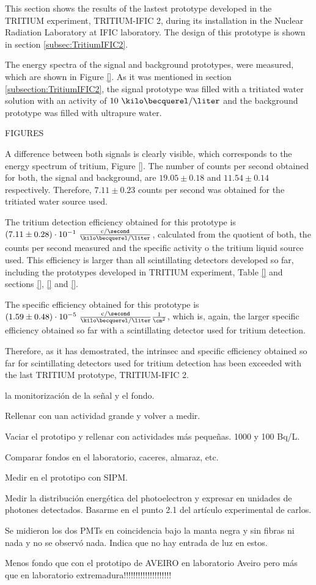 This section shows the results of the lastest prototype developed in the TRITIUM experiment, TRITIUM-IFIC 2, during its installation in the Nuclear Radiation Laboratory at IFIC laboratory. The design of this prototype is shown in section \ref{subsec:TritiumIFIC2}.

The energy spectra of the signal and background prototypes, were measured, which are shown in Figure \ref{}. As it was mentioned in section \ref{subsection:TritiumIFIC2}, the signal prototype was filled with a tritiated water solution with an activity of $10~\kilo\becquerel/\liter$ and the background prototype was filled with ultrapure water.

FIGURES

A difference between both signals is clearly visible, which corresponds to the energy spectrum of tritium, Figure \ref{}. The number of counts per second obtained for both, the signal and background, are $19.05 \pm 0.18$ and $11.54 \pm 0.14$ respectively. Therefore, $7.11 \pm 0.23$ counts per second was obtained for the tritiated water source used.

The tritium detection efficiency obtained for this prototype is $(7.11 \pm 0.28)\cdot{} 10^{-1}~ \frac{\text{c}/\second}{\kilo\becquerel/\liter}$, calculated from the quotient of both, the counts per second measured and the specific activity o the tritium liquid source used. This efficiency is larger than all scintillating detectors developed so far, including the prototypes developed in TRITIUM experiment, Table \ref{} and sections \ref{}, \ref{} and \ref{}.

The specific efficiency obtained for this prototype is $(1.59 \pm 0.48)\cdot{} 10^{-5}~ \frac{\text{c}/\second}{\kilo\becquerel/\liter}\frac{1}{\cm^{2}}$, which is, again, the larger specific efficiency obtained so far with a scintillating detector used for tritium detection.

Therefore, as it has demostrated, the intrinsec and specific efficiency obtained so far for scintillating detectors used for tritium detection has been exceeded with the last TRITIUM prototype, TRITIUM-IFIC 2.


la monitorización de la señal y el fondo.

Rellenar con uan actividad grande y volver a medir. 

Vaciar el prototipo y rellenar con actividades más pequeñas. 1000 y 100 Bq/L.

Comparar fondos en el laboratorio, caceres, almaraz, etc.

Medir en el prototipo con SIPM.

Medir la distribución energética del photoelectron y expresar en unidades de photones detectados. Basarme en el punto 2.1 del artículo experimental de carlos.

Se midieron los dos PMTs en coincidencia bajo la manta negra y sin fibras ni nada y no se observó nada. Indica que no hay entrada de luz en estos.

Menos fondo que con el prototipo de AVEIRO en laboratorio Aveiro pero más que en laboratorio extremadura!!!!!!!!!!!!!!!!!!!!